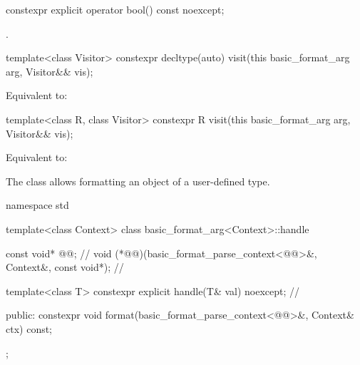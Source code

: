 %

%
\begin{itemdecl}
constexpr explicit operator bool() const noexcept;
\end{itemdecl}

\begin{itemdescr}
\pnum
\returns
{}.
\end{itemdescr}

%
\begin{itemdecl}
template<class Visitor>
  constexpr decltype(auto) visit(this basic_format_arg arg, Visitor&& vis);
\end{itemdecl}

\begin{itemdescr}
\pnum
\effects
Equivalent to: 
\end{itemdescr}

%
\begin{itemdecl}
template<class R, class Visitor>
  constexpr R visit(this basic_format_arg arg, Visitor&& vis);
\end{itemdecl}

\begin{itemdescr}
\pnum
\effects
Equivalent to: 
\end{itemdescr}

\pnum
The class  allows formatting an object of a user-defined type.

%
%
\begin{codeblock}
namespace std {
  template<class Context>
  class basic_format_arg<Context>::handle {
    const void* @@;                                                   // \expos
    void (*@@)(basic_format_parse_context<@@>&,
                    Context&, const void*);                             // \expos

    template<class T> constexpr explicit handle(T& val) noexcept;       // \expos

  public:
    constexpr void format(basic_format_parse_context<@@>&, Context& ctx) const;
  };
}
\end{codeblock}

